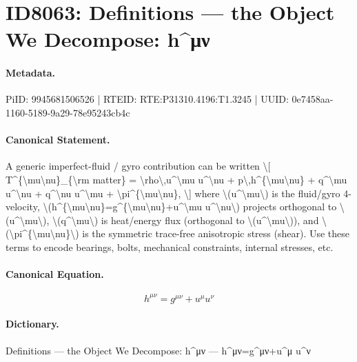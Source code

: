 \section*{ID8063: Definitions — the Object We Decompose: h\textasciicircum{}μν}
\paragraph{Metadata.}
PiID: 9945681506526 | RTEID: RTE:P31310.4196:T1.3245 | UUID: 0e7458aa-1160-5189-9a29-78e95243cb4c

\paragraph{Canonical Statement.}
A generic imperfect-fluid / gyro contribution can be written \textbackslash{}[ T\textasciicircum{}\{\textbackslash{}mu\textbackslash{}nu\}\_\{\textbackslash{}rm matter\} = \textbackslash{}rho\textbackslash{},u\textasciicircum{}\textbackslash{}mu u\textasciicircum{}\textbackslash{}nu + p\textbackslash{},h\textasciicircum{}\{\textbackslash{}mu\textbackslash{}nu\} + q\textasciicircum{}\textbackslash{}mu u\textasciicircum{}\textbackslash{}nu + q\textasciicircum{}\textbackslash{}nu u\textasciicircum{}\textbackslash{}mu + \textbackslash{}pi\textasciicircum{}\{\textbackslash{}mu\textbackslash{}nu\}, \textbackslash{}] where \textbackslash{}(u\textasciicircum{}\textbackslash{}mu\textbackslash{}) is the fluid/gyro 4-velocity, \textbackslash{}(h\textasciicircum{}\{\textbackslash{}mu\textbackslash{}nu\}=g\textasciicircum{}\{\textbackslash{}mu\textbackslash{}nu\}+u\textasciicircum{}\textbackslash{}mu u\textasciicircum{}\textbackslash{}nu\textbackslash{}) projects orthogonal to \textbackslash{}(u\textasciicircum{}\textbackslash{}mu\textbackslash{}), \textbackslash{}(q\textasciicircum{}\textbackslash{}mu\textbackslash{}) is heat/energy flux (orthogonal to \textbackslash{}(u\textasciicircum{}\textbackslash{}mu\textbackslash{})), and \textbackslash{}(\textbackslash{}pi\textasciicircum{}\{\textbackslash{}mu\textbackslash{}nu\}\textbackslash{}) is the symmetric trace-free anisotropic stress (shear). Use these terms to encode bearings, bolts, mechanical constraints, internal stresses, etc.

\paragraph{Canonical Equation.}
\[
h^{\mu\nu}=g^{\mu\nu}+u^\mu u^\nu
\]

\paragraph{Dictionary.}
Definitions — the Object We Decompose: h\textasciicircum{}μν — h\textasciicircum{}μν=g\textasciicircum{}μν+u\textasciicircum{}μ u\textasciicircum{}ν

